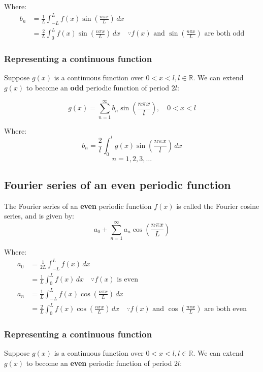 \documentclass[11pt]{article}
\begin{document}
Where:
\begin{align*}
b_n &= \frac{1}{L} \int_{-L}^{L} f(x) \sin \left( \frac{n \pi x}{L} \right) \, dx \\
&= \frac{2}{L} \int_0^L f(x) \sin \left( \frac{n \pi x}{L} \right) \, dx \quad \because f(x) \text{ and } \sin \left( \frac{n \pi x}{L} \right) \text{ are both odd}
\end{align*}

\subsubsection{Representing a continuous function}
\label{sec:org8f79d12}
Suppose \(g(x)\) is a continuous function over \(0 < x < l, l \in \mathbb{R}\). We can extend \(g(x)\) to become an \textbf{odd} periodic function of period \(2l\):

\[g(x) = \sum_{n = 1}^{\infty} b_n \sin \left( \frac{n \pi x}{l} \right), \quad 0 < x < l\]

Where:
\[b_n = \frac{2}{l} \int_0^l g(x) \sin \left( \frac{n \pi x}{l} \right) \, dx\]
\[n = 1, 2, 3, \ldots\]

 \newpage

\subsection{Fourier series of an even periodic function}
\label{sec:org19f5514}
The Fourier series of an \textbf{even} periodic function \(f(x)\) is called the Fourier cosine series, and is given by:
\[a_0 + \sum_{n = 1}^{\infty} a_n \cos \left( \frac{n \pi x}{L} \right)\]

Where:
\begin{align*}
a_0 &= \frac{1}{2L} \int_{-L}^{L} f(x) \, dx \\
&= \frac{1}{L} \int_0^L f(x) \, dx \quad \because f(x) \text{ is even} \\
a_n &= \frac{1}{L} \int_{-L}^{L} f(x) \cos \left( \frac{n \pi x}{L} \right) \, dx \\
&= \frac{2}{L} \int_0^L f(x) \cos \left( \frac{n \pi x}{L} \right) \, dx \quad \because f(x) \text{ and } \cos \left( \frac{n \pi x}{L} \right) \text{ are both even}
\end{align*}

\subsubsection{Representing a continuous function}
\label{sec:orga52f45e}
Suppose \(g(x)\) is a continuous function over \(0 < x < l, l \in \mathbb{R}\). We can extend \(g(x)\) to become an \textbf{even} periodic function of period \(2l\):
\end{document}

